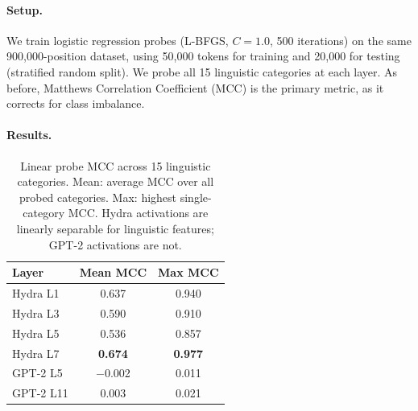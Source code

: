 \documentclass[11pt]{article}
\begin{document}
\paragraph{Setup.}
We train logistic regression probes (L-BFGS, $C=1.0$, 500 iterations) on 
the same 900,000-position dataset, using 50,000 tokens for training and 
20,000 for testing (stratified random split). We probe all 15 linguistic 
categories at each layer. As before, Matthews Correlation Coefficient 
(MCC) is the primary metric, as it corrects for class imbalance.

\paragraph{Results.}

\begin{table}[t]
\centering
\small
\begin{tabular}{@{}lcc@{}}
\toprule
\textbf{Layer} & \textbf{Mean MCC} & \textbf{Max MCC} \\
\midrule
Hydra L1  & 0.637 & 0.940 \\
Hydra L3  & 0.590 & 0.910 \\
Hydra L5  & 0.536 & 0.857 \\
Hydra L7  & \textbf{0.674} & \textbf{0.977} \\
\midrule
GPT-2 L5  & $-$0.002 & 0.011 \\
GPT-2 L11 & 0.003 & 0.021 \\
\bottomrule
\end{tabular}
\caption{Linear probe MCC across 15 linguistic categories. Mean: average 
MCC over all probed categories. Max: highest single-category MCC. Hydra 
activations are linearly separable for linguistic features; GPT-2 
activations are not.}
\label{tab:probes-summary}
\end{table}
\end{document}
